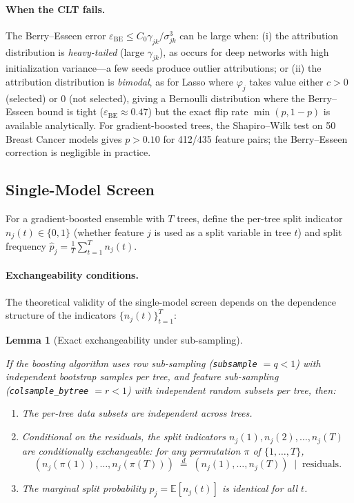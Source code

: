 \documentclass{article}
\newtheorem{lemma}[theorem]{Lemma}
\newcommand{\E}{\mathbb{E}}
\begin{document}
\paragraph{When the CLT fails.}
The Berry--Esseen error $\varepsilon_{\text{BE}} \leq C_0 \gamma_{jk}/\sigma_{jk}^3$ can be large when: (i) the attribution distribution is \emph{heavy-tailed} (large $\gamma_{jk}$), as occurs for deep networks with high initialization variance---a few seeds produce outlier attributions; or (ii) the attribution distribution is \emph{bimodal}, as for Lasso where $\varphi_j$ takes value either $c > 0$ (selected) or $0$ (not selected), giving a Bernoulli distribution where the Berry--Esseen bound is tight ($\varepsilon_{\text{BE}} \approx 0.47$) but the exact flip rate $\min(p, 1-p)$ is available analytically. For gradient-boosted trees, the Shapiro--Wilk test on 50 Breast Cancer models gives $p > 0.10$ for 412/435 feature pairs; the Berry--Esseen correction is negligible in practice.

\subsection{Single-Model Screen}
\label{sec:f5}

\begin{sloppypar}
For a gradient-boosted ensemble with $T$ trees, define the per-tree split indicator
$n_j(t) \in \{0,1\}$ (whether feature $j$ is used as a split variable in tree $t$)
and split frequency $\hat{p}_j = \frac{1}{T}\sum_{t=1}^T n_j(t)$.
\end{sloppypar}

\paragraph{Exchangeability conditions.}
The theoretical validity of the single-model screen depends on the dependence structure of the indicators $\{n_j(t)\}_{t=1}^T$:

\begin{lemma}[Exact exchangeability under sub-sampling]
\label{lem:exchange-subsample}
\begin{sloppypar}
If the boosting algorithm uses row sub-sampling (\texttt{subsample} $= q < 1$) with
independent bootstrap samples per tree, and feature sub-sampling
(\texttt{colsample\_bytree} $= r < 1$) with independent random subsets per tree,
then:
\end{sloppypar}
\begin{enumerate}
    \item The per-tree data subsets are independent across trees.
    \item Conditional on the residuals, the split indicators $n_j(1), n_j(2), \ldots, n_j(T)$ are \emph{conditionally exchangeable}: for any permutation $\pi$ of $\{1, \ldots, T\}$,
    \[
        (n_j(\pi(1)), \ldots, n_j(\pi(T))) \;\overset{d}{=}\;
        (n_j(1), \ldots, n_j(T)) \;\mid\; \text{residuals}.
    \]
    \item The marginal split probability $p_j = \E[n_j(t)]$ is identical for all $t$.
\end{enumerate}
\end{lemma}
\end{document}
